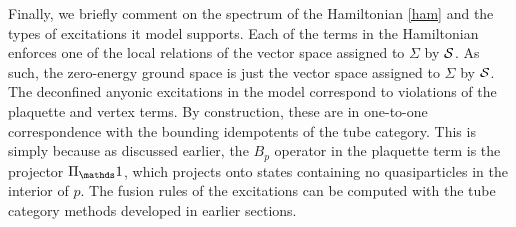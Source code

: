 Finally, we briefly comment on the spectrum of the Hamiltonian \eqref{ham} and the types of excitations it model supports. 
Each of the terms in the Hamiltonian enforces one of the local relations of the vector space assigned to $\Sigma$ by $\mathcal{S}$. 
As such, the zero-energy ground space is just the vector space assigned to $\Sigma$ by $\mathcal{S}$.
The deconfined anyonic excitations in the model correspond to violations of the plaquette and vertex terms.
By construction, these are in one-to-one correspondence with the bounding idempotents of the tube category.
This is simply because as discussed earlier, the $B_p$ operator in the plaquette term is the projector $\Pi_\unit$, which projects onto states containing no quasiparticles in the interior of $p$. 
The fusion rules of the excitations can be computed with the tube category methods developed in earlier sections. 

